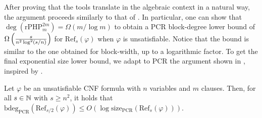 After proving that the tools translate in the algebraic context in a natural way, the argument proceeds similarly to that of . In particular, one can show that $\deg(\mathrm{rPHP}^{2m}_m) = \Omega(m / \log m)$ \cite{alg_nphard, raz_pc,rphp_2} to obtain a PCR block-degree lower bound of $\Omega\left ( \frac{s}{n^2 \log^2(s/n)} \right )$ for $\mathrm{Ref}_s(\varphi)$ when $\varphi$ is unsatisfiable. Notice that the bound is similar to the one obtained for block-width, up to a logarithmic factor. To get the final exponential size lower bound, we adapt to PCR the argument shown in , inspired by \cite{pc_tradeoff,lauria_optim}.

\begin{lemma}
    \label{lem:tradeoff_bd_size}
    Let $\varphi$ be an unsatisfiable CNF formula with $n$ variables and $m$ clauses. Then, for all $s \in \mathbb{N}$ with $s \geq n^2$, it holds that $\mathrm{bdeg}_{\mathrm{PCR}}(\mathrm{Ref}_{s/2}(\varphi)) \leq O(\log \mathrm{size}_{\mathrm{PCR}}(\mathrm{Ref}_{s}(\varphi)))$.
\end{lemma}

